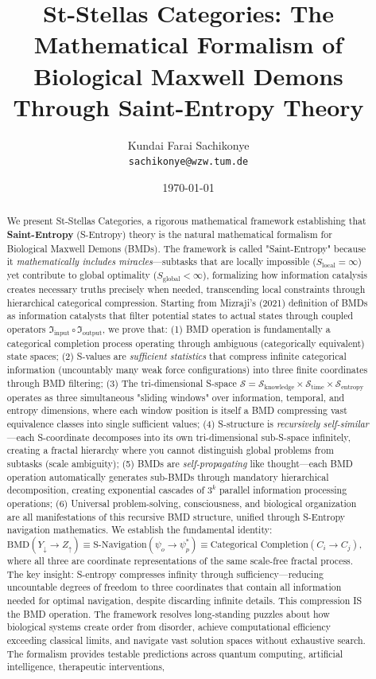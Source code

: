 \documentclass[12pt,a4paper]{article}
\title{St-Stellas Categories: The Mathematical Formalism of Biological Maxwell Demons Through Saint-Entropy Theory}
\author{Kundai Farai Sachikonye\\
\texttt{sachikonye@wzw.tum.de}}
\date{\today}
\begin{document}
\maketitle

\begin{abstract}
We present St-Stellas Categories, a rigorous mathematical framework establishing that \textbf{Saint-Entropy} (S-Entropy) theory is the natural mathematical formalism for Biological Maxwell Demons (BMDs). The framework is called "Saint-Entropy" because it \textit{mathematically includes miracles}—subtasks that are locally impossible ($S_{\text{local}} = \infty$) yet contribute to global optimality ($S_{\text{global}} < \infty$), formalizing how information catalysis creates necessary truths precisely when needed, transcending local constraints through hierarchical categorical compression. Starting from Mizraji's (2021) definition of BMDs as information catalysts that filter potential states to actual states through coupled operators $\Im_{\text{input}} \circ \Im_{\text{output}}$, we prove that: (1) BMD operation is fundamentally a categorical completion process operating through ambiguous (categorically equivalent) state spaces; (2) S-values are \textit{sufficient statistics} that compress infinite categorical information (uncountably many weak force configurations) into three finite coordinates through BMD filtering; (3) The tri-dimensional S-space $\mathcal{S} = \mathcal{S}_{\text{knowledge}} \times \mathcal{S}_{\text{time}} \times \mathcal{S}_{\text{entropy}}$ operates as three simultaneous "sliding windows" over information, temporal, and entropy dimensions, where each window position is itself a BMD compressing vast equivalence classes into single sufficient values; (4) S-structure is \textit{recursively self-similar}—each S-coordinate decomposes into its own tri-dimensional sub-S-space infinitely, creating a fractal hierarchy where you cannot distinguish global problems from subtasks (scale ambiguity); (5) BMDs are \textit{self-propagating} like thought—each BMD operation automatically generates sub-BMDs through mandatory hierarchical decomposition, creating exponential cascades of $3^k$ parallel information processing operations; (6) Universal problem-solving, consciousness, and biological organization are all manifestations of this recursive BMD structure, unified through S-Entropy navigation mathematics. We establish the fundamental identity: $\text{BMD}(Y_{\downarrow} \to Z_{\uparrow}) \equiv \text{S-Navigation}(\psi_o \to \psi_p^*) \equiv \text{Categorical Completion}(C_i \to C_j)$, where all three are coordinate representations of the same scale-free fractal process. The key insight: S-entropy compresses infinity through sufficiency—reducing uncountable degrees of freedom to three coordinates that contain all information needed for optimal navigation, despite discarding infinite details. This compression IS the BMD operation. The framework resolves long-standing puzzles about how biological systems create order from disorder, achieve computational efficiency exceeding classical limits, and navigate vast solution spaces without exhaustive search. The formalism provides testable predictions across quantum computing, artificial intelligence, therapeutic interventions, 
\end{abstract}
\end{document}
